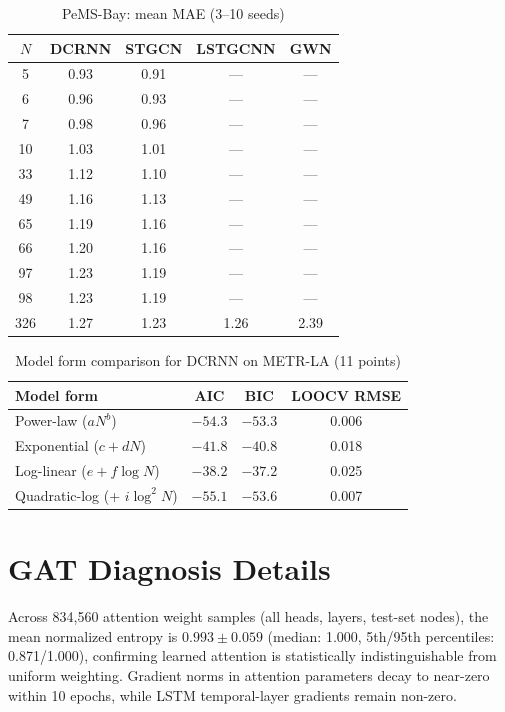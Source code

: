 \documentclass[sigconf]{acmart}
\begin{document}
\begin{table}[h]
\small
\centering
\caption{PeMS-Bay: mean MAE (3--10 seeds)}
\label{tab:pems_full}
\begin{tabular}{ccccc}
\toprule
$N$ & DCRNN & STGCN & LSTGCNN & GWN \\
\midrule
5   & 0.93 & 0.91 & --- & --- \\
6   & 0.96 & 0.93 & --- & --- \\
7   & 0.98 & 0.96 & --- & --- \\
10  & 1.03 & 1.01 & --- & --- \\
33  & 1.12 & 1.10 & --- & --- \\
49  & 1.16 & 1.13 & --- & --- \\
65  & 1.19 & 1.16 & --- & --- \\
66  & 1.20 & 1.16 & --- & --- \\
97  & 1.23 & 1.19 & --- & --- \\
98  & 1.23 & 1.19 & --- & --- \\
326 & 1.27 & 1.23 & 1.26 & 2.39 \\
\bottomrule
\end{tabular}
\end{table}

\begin{table}[h]
\small
\centering
\caption{Model form comparison for DCRNN on METR-LA (11 points)}
\label{tab:aic}
\begin{tabular}{lccc}
\toprule
Model form & AIC & BIC & LOOCV RMSE \\
\midrule
Power-law ($a N^b$)           & $-54.3$ & $-53.3$ & 0.006 \\
Exponential ($c + dN$)        & $-41.8$ & $-40.8$ & 0.018 \\
Log-linear ($e + f\log N$)    & $-38.2$ & $-37.2$ & 0.025 \\
Quadratic-log (+ $i\log^2 N$) & $-55.1$ & $-53.6$ & 0.007 \\
\bottomrule
\end{tabular}
\end{table}

\section{GAT Diagnosis Details}
\label{app:gat}

Across 834,560 attention weight samples (all heads, layers, test-set nodes), the mean normalized entropy is $0.993 \pm 0.059$ (median: 1.000, 5th/95th percentiles: 0.871/1.000), confirming learned attention is statistically indistinguishable from uniform weighting. Gradient norms in attention parameters decay to near-zero within 10 epochs, while LSTM temporal-layer gradients remain non-zero.
\end{document}
